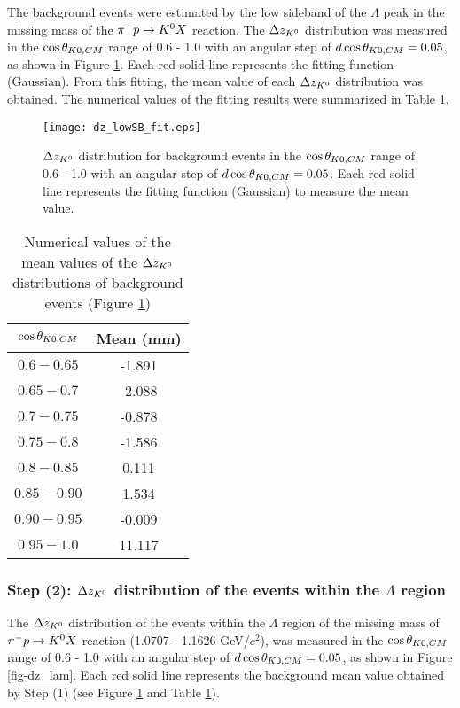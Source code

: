 The background events were estimated by the low sideband of the $\Lambda$ peak in the missing mass of the $\pi^- p \to K^0 X$ reaction. The $\Delta z_{K^{0}}$ distribution was measured in the $\cos{\theta_{K0,CM}}$ range of 0.6 - 1.0 with an angular step of $d\cos{\theta_{K0,CM}}=0.05$, as shown in Figure \ref{fig-dz_lowSB_fit}. Each red solid line represents the fitting function (Gaussian). From this fitting, the mean value of each $\Delta z_{K^{0}}$ distribution was obtained. The numerical values of the fitting results were summarized in Table \ref{tab-dz_lowSB_fit}. 

\begin{figure}[h]
  \centering
  \texttt{[image: dz\_lowSB\_fit.eps]}
  \caption{$\Delta z_{K^{0}}$ distribution for background events in the $\cos{\theta_{K0,CM}}$ range of 0.6 - 1.0 with an angular step of $d\cos{\theta_{K0,CM}}=0.05$. Each red solid line represents the fitting function (Gaussian) to measure the mean value.}
  \label{fig-dz_lowSB_fit}
\end{figure}

\begin{table}[!h] 
  \begin{center}
  \caption{Numerical values of the mean values of the $\Delta z_{K^{0}}$ distributions of background events (Figure \ref{fig-dz_lowSB_fit})}
  \centering
  \begin{threeparttable}
    \begin{tabular}{cc}
    $\cos{\theta_{K0,CM}}$ & Mean (mm) \\
    \midrule\midrule
    $0.6-0.65$ & -1.891 \\
    \midrule
    $0.65-0.7$ & -2.088 \\
    \midrule
    $0.7-0.75$ & -0.878 \\
    \midrule
    $0.75-0.8$ & -1.586 \\
    \midrule
    $0.8-0.85$ & 0.111 \\
    \midrule
    $0.85-0.90$ & 1.534 \\
    \midrule
    $0.90-0.95$ & -0.009 \\
    \midrule
    $0.95-1.0$ & 11.117 \\
    \end{tabular}
  \end{threeparttable}
  \label{tab-dz_lowSB_fit}
  \end{center}
\end{table}

\subsubsection{Step (2): $\Delta z_{K^{0}}$ distribution of the events within the $\Lambda$ region}
The $\Delta z_{K^{0}}$ distribution of the events within the $\Lambda$ region of the missing mass of $\pi^- p \to K^0 X$ reaction (1.0707 - 1.1626 GeV/$c^{2}$), was measured in the $\cos{\theta_{K0,CM}}$ range of 0.6 - 1.0 with an angular step of $d\cos{\theta_{K0,CM}}=0.05$, as shown in Figure \ref{fig-dz_lam}. Each red solid line represents the background mean value obtained by Step (1) (see Figure \ref{fig-dz_lowSB_fit} and Table \ref{tab-dz_lowSB_fit}). 

